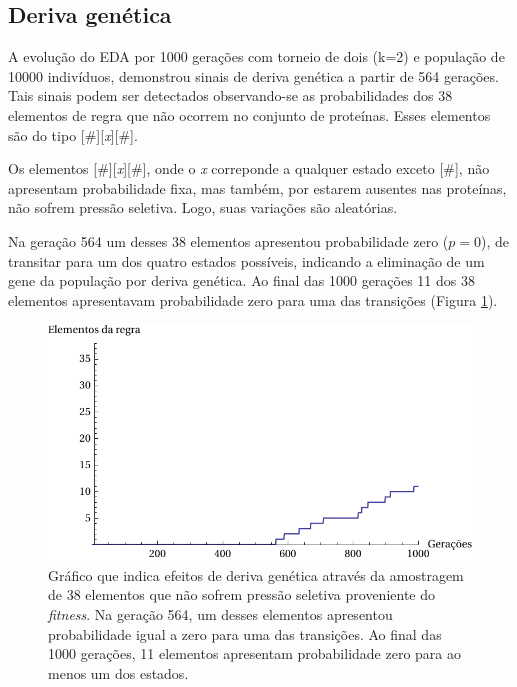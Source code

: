\subsection{Deriva genética}

A evolução do EDA por 1000 gerações com torneio de dois (k=2) e população de 10000 indivíduos, demonstrou sinais de deriva genética a partir de 564 gerações. Tais sinais podem ser detectados observando-se as probabilidades dos 38 elementos de regra que não ocorrem no conjunto de proteínas. Esses elementos são do tipo [\#][\textit{x}][\#].

Os elementos [\#][\textit{x}][\#], onde o \textit{x} correponde a qualquer estado exceto [\#], não apresentam probabilidade fixa, mas também, por estarem ausentes nas proteínas, não sofrem pressão seletiva. Logo, suas variações são aleatórias.

Na geração 564 um desses 38 elementos apresentou probabilidade zero ($p=0$), de transitar para um dos quatro estados possíveis, indicando a eliminação de um gene da população por deriva genética. Ao final das 1000 gerações 11 dos 38 elementos apresentavam probabilidade zero para uma das transições (Figura \ref{fig:deriva_genetica}).


\begin{figure}
  \centering
  \includegraphics[width=1\textwidth]{figures/deriva_genetica.pdf}
  \caption{Gráfico que indica efeitos de deriva genética através da amostragem de 38 elementos que não sofrem pressão seletiva proveniente do \textit{fitness}. Na geração 564, um desses elementos apresentou probabilidade igual a zero para uma das transições. Ao final das 1000 gerações, 11 elementos apresentam probabilidade zero para ao menos um dos estados.}
        \label{fig:deriva_genetica}
\end{figure}

